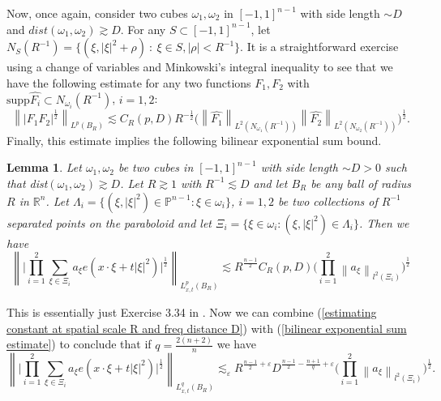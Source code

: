 \documentclass[11pt]{amsart}
\numberwithin{equation}{section}
\newcommand\norm[1]{\left\lVert#1\right\rVert}
\newcommand{\lpnorm}[3]{\norm{#1}_{L^{#2}(#3)}}
\newcommand{\litlpnorm}[3]{\norm{#1}_{l^{#2}(#3)}}
\newcommand{\parab}[1][]{\mathbb{P}^#1}
\newtheorem{lemma}[theorem]{Lemma}
\begin{document}
Now, once again, consider two cubes $\omega_1, \omega_2$ in $[-1,1]^{n-1}$ with side length $\sim D$ and $dist(\omega_1, \omega_2) \gtrsim D $. For any $S \subset [-1,1]^{n-1}$, let $N_S(R^{-1}) = \{(\xi, |\xi|^2 + \rho) \ : \ \xi \in S, |\rho| < R^{-1} \}$. It is a straightforward exercise using a change of variables and Minkowski's integral inequality to see that we have the following estimate for any two functions $F_1, F_2$ with $\text{supp}\widehat{F_i}  \subset N_{\omega_i}(R^{-1})$, $i = 1,2$:
\begin{equation}
    \lpnorm{\big| F_1 F_2 \big|^{\frac{1}{2}}}{p}{B_R} \lesssim C_{R}(p, D) R^{-\frac{1}{2}}\Big(\lpnorm{\widehat{F_1}}{2}{N_{\omega_1}(R^{-1})}\lpnorm{\widehat{F_2}}{2}{N_{\omega_2}(R^{-1})}\Big)^{\frac{1}{2}}.
\end{equation}
Finally, this estimate implies the following bilinear exponential sum bound.
\begin{lemma}
    Let $\omega_1, \omega_2$ be two cubes in $[-1,1]^{n-1}$ with side length $\sim D > 0$ such that dist$(\omega_1, \omega_2) \gtrsim D$. Let $R \gtrsim 1$ with $R^{-1} \lesssim D$ and let $B_{R}$ be any ball of radius $R$ in $\mathbb{R}^n$. Let $\Lambda_i = \{(\xi, |\xi|^2) \in \parab{n-1} :   \xi \in \omega_i \}$, $i  =1,2$ be two collections of $R^{-1}$ separated points on the paraboloid and let $\Xi_i = \{\xi \in \omega_i : (\xi, |\xi|^2) \in \Lambda_i \}$. Then we have
    \begin{equation} \label{bilinear exponential sum estimate}
        \norm{\Big| \prod_{i = 1}^{2} \sum_{\xi \in \Xi_i}a_{\xi} e(x \cdot \xi + t|\xi|^2) \Big|^{\frac{1}{2}}}_{L_{x,t}^{p}(B_R)} \lesssim R^{\frac{n-1}{2}} C_{R}(p, D) \Big( \prod_{i = 1}^{2} \litlpnorm{a_{\xi}}{2}{\Xi_i} \Big)^{\frac{1}{2}}
    \end{equation}
\end{lemma}
\noindent 
This is essentially just Exercise 3.34 in \cite{demeter2020fourier}. Now we can combine (\ref{estimating constant at spatial scale R and freq distance D}) with (\ref{bilinear exponential sum estimate}) to conclude that if $q = \frac{2(n+2)}{n}$ we have 
\begin{equation} \label{improved bilinear exponential sum estimate}
       \norm{\Big| \prod_{i = 1}^{2} \sum_{\xi \in \Xi_i}a_{\xi} e(x \cdot \xi + t|\xi|^2) \Big|^{\frac{1}{2}}}_{L_{x,t}^{q}(B_R)} \lesssim_{\varepsilon} R^{\frac{n-1}{2} + \varepsilon} D^{\frac{n-1}{2} - \frac{n+1}{q} + \varepsilon} \Big( \prod_{i = 1}^{2} \litlpnorm{a_\xi}{2}{\Xi_i} \Big)^{\frac{1}{2}}.
\end{equation}
\end{document}
